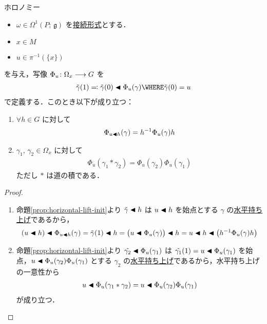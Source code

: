 \documentclass[geometry_main]{subfiles}
\begin{document}
\begin{myprop}[label=prop:holonomy]{ホロノミー}
    \begin{itemize}
        \item $\omega \in \Omega^1(P;\, \mathfrak{g})$ を\hyperref[def:connection]{接続形式}とする．
        \item $x \in M$
        \item $u \in \pi^{-1}(\{x\})$
    \end{itemize}
    を与え，写像 $\Phi_u \colon \Omega_x \longrightarrow G$ を
    \begin{align}
        \tilde{\gamma}(1) \eqqcolon \tilde{\gamma}(0) \btl \Phi_u (\gamma) \WHERE \tilde{\gamma}(0) = u
    \end{align}
    で定義する．このとき以下が成り立つ：
    \begin{enumerate}
        \item $\forall h \in G$ に対して
        \begin{align}
            \Phi_{u \blacktriangleleft h} (\gamma) = h^{-1} \Phi_u (\gamma) h
        \end{align}
        \item $\gamma_1,\, \gamma_2 \in \Omega_x$ に対して
        \begin{align}
            \Phi_u (\gamma_1 * \gamma_2) = \Phi_u (\gamma_2) \Phi_u (\gamma_1)
        \end{align}
        ただし $*$ は道の積である．
    \end{enumerate}
\end{myprop}

\begin{proof}
    \begin{enumerate}
        \item 命題\ref{prop:horizontal-lift-init}より $\tilde{\gamma} \blacktriangleleft h$ は $u \blacktriangleleft h$ を始点とする $\gamma$ の\hyperref[def:horizontal-lift-curve]{水平持ち上げ}であるから，
        \begin{align}
            (u \blacktriangleleft h) \blacktriangleleft \Phi_{u \blacktriangleleft h}(\gamma) = \tilde{\gamma} (1) \blacktriangleleft h = \bigl(u \blacktriangleleft \Phi_u(\gamma)\bigr) \blacktriangleleft h = u \blacktriangleleft h \blacktriangleleft \bigl( h^{-1} \Phi_u (\gamma) h \bigr) 
        \end{align}
        \item 命題\ref{prop:horizontal-lift-init}より $\tilde{\gamma_2} \blacktriangleleft \Phi_u(\gamma_1)$ は $\tilde{\gamma_1}(1) = u \blacktriangleleft \Phi_u(\gamma_1)$ を始点，$u \blacktriangleleft \Phi_u(\gamma_2) \Phi_u(\gamma_1)$ とする $\gamma_2$ の\hyperref[def:horizontal-lift-curve]{水平持ち上げ}であるから，水平持ち上げの一意性から
        \begin{align}
            u \blacktriangleleft \Phi_u (\gamma_1 * \gamma_2) = u \blacktriangleleft \Phi_u(\gamma_2) \Phi_u(\gamma_1)
        \end{align}
        が成り立つ．
    \end{enumerate}
\end{proof}
\end{document}
